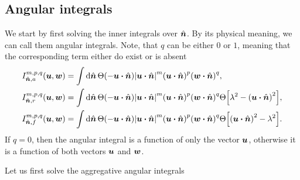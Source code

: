 \documentclass[aps,prl,preprint,groupedaddress,10pt]{revtex4-2}
\begin{document}
\subsection{Angular integrals}
We start by first solving the inner integrals over $\hat{\vb*{n}}$. By its physical meaning, we can call
them angular integrals. Note, that $q$ can be either $0$ or $1$, meaning that the
corresponding term either do exist or is absent
\begin{equation}
    \begin{split}
        I_{\bn,a}^{m,p,q}\pqty{\bu,\bw}&=\int\dd{\bn}\Theta\pqty{-\bu\vdot\bn}
        \abs{\bu\vdot\bn}^m\pqty{\bu\vdot\bn}^p\pqty{\bw\vdot\bn}^q,\\
        I_{\bn,r}^{m,p,q}\pqty{\bu,\bw}&=\int\dd{\bn}\Theta\pqty{-\bu\vdot\bn}
        \abs{\bu\vdot\bn}^m\pqty{\bu\vdot\bn}^p\pqty{\bw\vdot\bn}^q
        \Theta\bqty{\lambda^2-\pqty{\bu\vdot\bn}^2},\\
        I_{\bn,f}^{m,p,q}\pqty{\bu,\bw}&=\int\dd{\bn}\Theta\pqty{-\bu\vdot\bn}
        \abs{\bu\vdot\bn}^m\pqty{\bu\vdot\bn}^p\pqty{\bw\vdot\bn}^q
        \Theta\bqty{\pqty{\bu\vdot\bn}^2-\lambda^2}.\\
    \end{split}
\end{equation}
If $q=0$, then the angular integral is a function of only the vector $\vb*{u}$, otherwise it is
a function of both vectors $\vb*{u}$ and $\vb*{w}$.

Let us first solve the aggregative angular integrals
\end{document}
